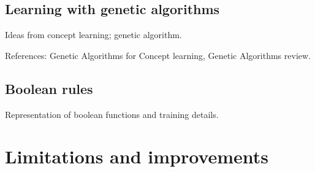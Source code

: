\subsection{Learning with genetic algorithms}

Ideas from concept learning; genetic algorithm.

References:
Genetic Algorithms for Concept learning\cite{bib:ga-for-concepts},
Genetic Algorithms review\cite{bib:ga-mutations-review}.

\subsection{Boolean rules}

Representation of boolean functions and training details.

\section{Limitations and improvements}

\label{sec:fluents-limitations}


